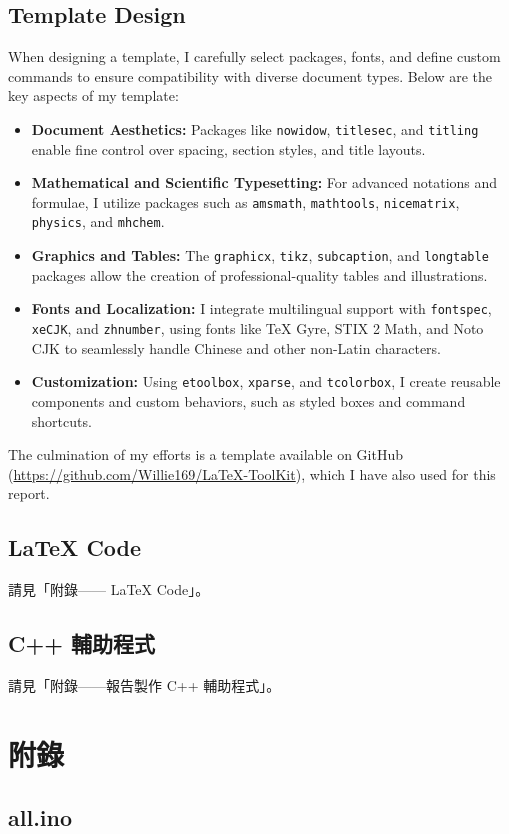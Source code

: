 \documentclass[a4paper,12pt]{./article}
\newcounter{xeCJK}
\newcounter{Fonts}
\begin{document}
\subsection{Template Design}
When designing a template, I carefully select packages, fonts, and define custom commands to ensure compatibility with diverse document types. Below are the key aspects of my template:  
\begin{itemize}  
\item \textbf{Document Aesthetics:} Packages like \texttt{nowidow}, \texttt{titlesec}, and \texttt{titling} enable fine control over spacing, section styles, and title layouts.  
\item \textbf{Mathematical and Scientific Typesetting:} For advanced notations and formulae, I utilize packages such as \texttt{amsmath}, \texttt{mathtools}, \texttt{nicematrix}, \texttt{physics}, and \texttt{mhchem}.  
\item \textbf{Graphics and Tables:} The \texttt{graphicx}, \texttt{tikz}, \texttt{subcaption}, and \texttt{longtable} packages allow the creation of professional-quality tables and illustrations.  
\item \textbf{Fonts and Localization:} I integrate multilingual support with \texttt{fontspec}, \texttt{xeCJK}, and \texttt{zhnumber}, using fonts like TeX Gyre, STIX 2 Math, and Noto CJK to seamlessly handle Chinese and other non-Latin characters.  \item \textbf{Customization:} Using \texttt{etoolbox}, \texttt{xparse}, and \texttt{tcolorbox}, I create reusable components and custom behaviors, such as styled boxes and command shortcuts.  
\end{itemize}
The culmination of my efforts is a template available on GitHub (\href{https://github.com/Willie169/LaTeX-ToolKit}{https://github.com/Willie169/LaTeX-ToolKit}), which I have also used for this report.  
\subsection{\LaTeX{} Code}
請見「附錄—— \LaTeX{} Code」。
\subsection{C++ 輔助程式}
請見「附錄——報告製作 C++ 輔助程式」。

\section{附錄}
\subsection{all.ino}

\end{document}
